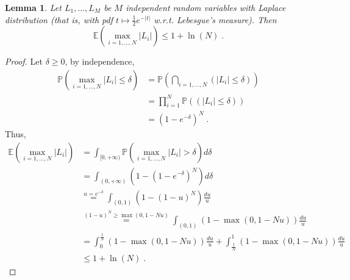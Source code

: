 \documentclass{article}
\theoremstyle{plain}
\newtheorem{lemma}[theorem]{Lemma}
\theoremstyle{definition}
\theoremstyle{remark}
\newcommand{\Prob}[0]{\mathbb{P}}
\newcommand{\E}[0]{\mathbb{E}}
\newcommand\p[1]{\left( {#1}\right)}
\begin{document}
\begin{lemma}
\label{lemma:maximumlaplace}
    Let $L_1, \dots, L_{M}$ be $M$ independent random variables with Laplace distribution (that is, with pdf $t \mapsto \frac{1}{2} e^{- |t|}$ w.r.t. Lebesgue's measure). Then 
    \begin{equation}
        \E \p{\max_{i = 1 , \dots, N} |L_i|  } \leq  1 + \ln \p{N} \;.
    \end{equation}
\end{lemma}
\begin{proof}
Let $\delta \geq 0$, by independence,
\begin{equation}
\begin{aligned}
    \Prob \p{\max_{i = 1 , \dots, N} |L_i| \leq \delta } 
    &= \Prob \p{\bigcap_{i = 1 , \dots, N} (|L_i| \leq \delta) } \\
    &= \prod_{i = 1}^N \Prob \p{ (|L_i| \leq \delta) } \\
    &= \p{1 - e^{-\delta}}^N \;.
\end{aligned}
\end{equation}
Thus, 
\begin{equation}
    \begin{aligned}
        \E \p{\max_{i = 1 , \dots, N} |L_i|  }
        &= \int_{[0, +\infty)} \Prob \p{\max_{i = 1 , \dots, N} |L_i| > \delta } d\delta \\
        &= \int_{(0, +\infty)} \p{1 - \p{1 - e^{-\delta}}^N} d\delta \\
        &\stackrel{u = e^{- \delta}}{=} \int_{(0, 1)} \p{1 - \p{1 - u}^N} \frac{du}{u} \\
        &\stackrel{\p{1 - u}^N \geq \max(0, 1 - Nu)}{=} \int_{(0, 1)} \p{1 - \max(0, 1 - Nu)} \frac{du}{u} \\
        &\stackrel{}{=} \int_0^{\frac{1}{N}} \p{1 - \max(0, 1 - Nu)} \frac{du}{u} + \int_{\frac{1}{N}}^1 \p{1 - \max(0, 1 - Nu)} \frac{du}{u} \\
        &\leq 1 + \ln \p{N} \;.
    \end{aligned}
\end{equation}
\end{proof}
\end{document}
